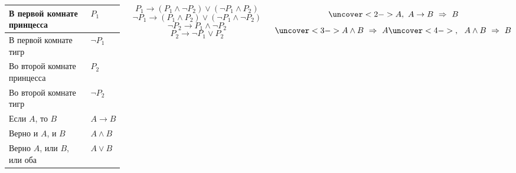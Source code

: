 \documentclass[aspectratio=169]{beamer}
\begin{document}
\begin{frame}[plain]
\begin{columns}


\begin{tabular}{l| l}
В первой комнате принцесса & $P_1$ \\ \hline 
В первой комнате тигр & $\neg P_1$ \\ \hline 
Во второй комнате принцесса & $P_2$ \\ \hline 
Во второй комнате тигр & $\neg P_2$ \\ \hline 
Если $A$, то $B$ & $A\rightarrow B$ \\ \hline 
Верно и $A$, и $B$ & $A\wedge B$ \\ \hline
Верно $A$, или $B$, или оба & $A\vee B$ \\ 
\end{tabular}

$$
P_1\rightarrow(P_1\wedge \neg P_2)\vee (\neg P_1 \wedge P_2)
$$ $$
\neg P_1\rightarrow(P_1\wedge P_2)\vee (\neg P_1 \wedge \neg P_2)
$$ $$
\neg P_2\rightarrow P_1 \wedge \neg P_2
$$ $$
P_2\rightarrow \neg P_1 \vee P_2
$$


$$
\uncover<2->{A,\ A\rightarrow B\ \Rightarrow\ B}
$$ $$
\uncover<3->{A\wedge B\ \Rightarrow\ A} \uncover<4->{,\ \ A\wedge B\ \Rightarrow\ B}
$$ 
\end{columns}
\end{frame}
\end{document}
